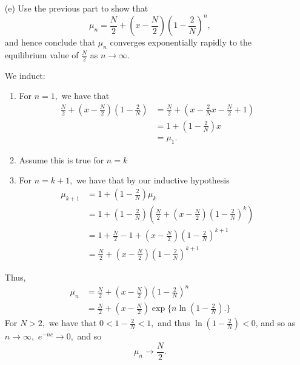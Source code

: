 \documentclass[11pt]{article}
\begin{document}
\begin{enumerate}
\begin{solution}
    \end{solution}
    \item[(e)] Use the previous part to show that
    \[
    \mu_n = \frac{N}{2} + \left( x - \frac{N}{2} \right) \left( 1 - \frac{2}{N} \right)^n,
    \]
    and hence conclude that \( \mu_n \) converges exponentially rapidly to the equilibrium value of \( \frac{N}{2} \) as \( n \to \infty \).
\begin{solution}
    We induct:
    \begin{enumerate}
        \item For $n = 1,$ we have that 
        \begin{align*}
            \frac{N}{2} + (x- \frac{N}{2})(1 - \frac{2}{N})
            &= \frac{N}{2} + (x - \frac{2}{N}x - \frac{N}{2} + 1)\\
            &= 1 + (1 - \frac{2}{N})x\\
            &= \mu_1.
        \end{align*}
        \item Assume this is true for $n = k$
        \item For $n = k+1,$ we have that by our inductive hypothesis
        \begin{align*}
            \mu_{k+1} &= 1+  (1 - \frac{2}{N})\mu_{k}\\
            &= 1 + (1- \frac{2}{N})\left(\frac{N}{2} + (x - \frac{N}{2})(1 - \frac{2}{N})^k\right)\\
            &= 1 + \frac{N}{2} - 1 + (x- \frac{N}{2})(1-\frac{2}{N})^{k+1}\\
            &= \frac{N}{2} + (x- \frac{N}{2})(1-\frac{2}{N})^{k+1}
        \end{align*}
    \end{enumerate}

Thus, 
\begin{align*}
\mu_n &= \frac{N}{2} + (x - \frac{N}{2})(1- \frac{2}{N})^n\\
&= \frac{N}{2} + (x - \frac{N}{2})\exp\{n \ln(1 - \frac{2}{N}).\} 
\end{align*}
For $N > 2,$ we have that $0 <1- \frac{2}{N}  < 1,$ and thus 
$\ln(1 - \frac{2}{N}) < 0$, and so 
as $n\to \infty,$ $e^{-nc}\to 0,$ and so 
\[\mu_n \to \frac{N}{2}.\]

\end{solution}
\end{enumerate}


\newpage
\end{document}
